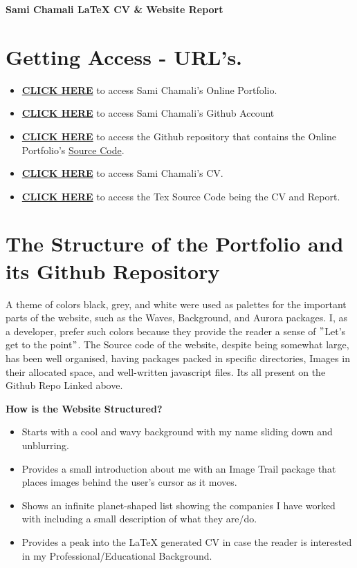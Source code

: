 \documentclass[12pt, letterpaper]{article}
\begin{document}
    \begin{center}
        \textbf{Sami Chamali LaTeX CV \& Website Report}


    \end{center}
    \section{Getting Access - URL's.}
    \begin{itemize}
        \item \textbf{\href{https://samichamali.github.io/portfolio}{CLICK HERE}} to access Sami Chamali's Online Portfolio.
        \item \textbf{\href{https://github.com/samichamali}{CLICK HERE}} to access Sami Chamali's Github Account
        \item \textbf{\href{https://github.com/samichamali/portfolio}{CLICK HERE}} to access the Github repository that contains the Online Portfolio's \underline{Source Code}.
        \item \textbf{\href{https://samichamali.github.io/portfolio/Images/CV.pdf}{CLICK HERE}} to access Sami Chamali's CV.
        \item \href{https://github.com/samichamali/portfolio/tree/main/CV%20and%20Report%20Tex%20Files}{\textbf{CLICK HERE}} to access the Tex Source Code being the CV and Report.
    \end{itemize}

    \section{The Structure of the Portfolio and its Github Repository}
    A theme of colors black, grey, and white were used as palettes for the important parts of the website, such as the Waves, Background, and Aurora packages. I, as a developer, prefer such colors because they provide the reader a sense of \("\)Let's get to the point\("\).
    The Source code of the website, despite being somewhat large, has been well organised, having packages packed in specific directories, Images in their allocated space, and well-written javascript files. Its all present on the Github Repo Linked above.
    \par \textbf{How is the Website Structured?}
    \begin{itemize}
        \item Starts with a cool and wavy background with my name sliding down and unblurring.
        \item Provides a small introduction about me with an Image Trail package that places images behind the user's cursor as it moves.
        \item Shows an infinite planet-shaped list showing the companies I have worked with including a small description of what they are/do.
        \item Provides a peak into the LaTeX generated CV in case the reader is interested in my Professional/Educational Background.
    \end{itemize}
\end{document}
